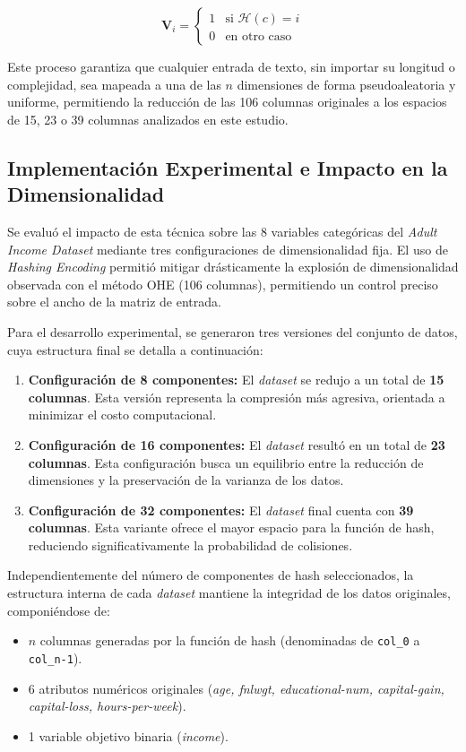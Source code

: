 \documentclass[a4paper,10pt]{book}
\begin{document}
		\begin{equation}
			\mathbf{V}_i = \begin{cases} 1 & \text{si } \mathcal{H}(c) = i \\ 0 & \text{en otro caso} \end{cases}
		\end{equation}
		
		Este proceso garantiza que cualquier entrada de texto, sin importar su longitud o complejidad, sea mapeada a una de las $n$ dimensiones de forma pseudoaleatoria y uniforme, permitiendo la reducción de las 106 columnas originales a los espacios de 15, 23 o 39 columnas analizados en este estudio.
	
	
		\subsection{Implementación Experimental e Impacto en la Dimensionalidad}
		
			Se evaluó el impacto de esta técnica sobre las 8 variables categóricas del \textit{Adult Income Dataset} mediante tres configuraciones de dimensionalidad fija. El uso de \textit{Hashing Encoding} permitió mitigar drásticamente la explosión de dimensionalidad observada con el método OHE (106 columnas), permitiendo un control preciso sobre el ancho de la matriz de entrada.
			
			Para el desarrollo experimental, se generaron tres versiones del conjunto de datos, cuya estructura final se detalla a continuación:
			
			\begin{enumerate}
				\item \textbf{Configuración de 8 componentes:} El \textit{dataset} se redujo a un total de \textbf{15 columnas}. Esta versión representa la compresión más agresiva, orientada a minimizar el costo computacional.
				\item \textbf{Configuración de 16 componentes:} El \textit{dataset} resultó en un total de \textbf{23 columnas}. Esta configuración busca un equilibrio entre la reducción de dimensiones y la preservación de la varianza de los datos.
				\item \textbf{Configuración de 32 componentes:} El \textit{dataset} final cuenta con \textbf{39 columnas}. Esta variante ofrece el mayor espacio para la función de hash, reduciendo significativamente la probabilidad de colisiones.
			\end{enumerate}
			
			Independientemente del número de componentes de hash seleccionados, la estructura interna de cada \textit{dataset} mantiene la integridad de los datos originales, componiéndose de:
			\begin{itemize}
				\item $n$ columnas generadas por la función de hash (denominadas de \texttt{col\_0} a \texttt{col\_n-1}).
				\item 6 atributos numéricos originales (\textit{age, fnlwgt, educational-num, capital-gain, capital-loss, hours-per-week}).
				\item 1 variable objetivo binaria (\textit{income}).
			\end{itemize}
			
\end{document}
